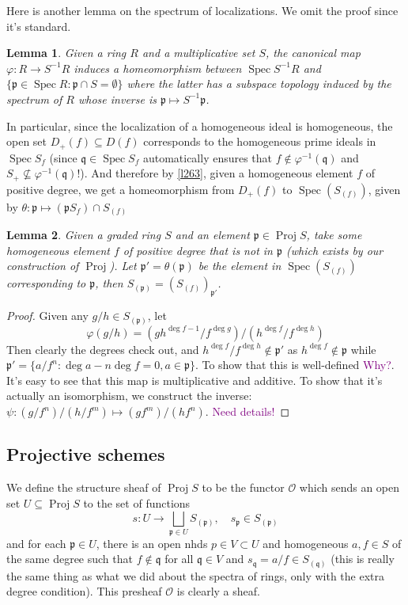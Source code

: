 \documentclass[12pt]{article}
\newtheorem{lemma}{Lemma}[subsection]
\theoremstyle{remark}
\newcommand{\Spec}[0]{\operatorname{Spec}}
\newcommand{\Proj}[0]{\operatorname{Proj}}
\begin{document}
	Here is another lemma on the spectrum of localizations. We omit the proof since it's standard.
	\begin{lemma}\label{l264}
		Given a ring $R$ and a multiplicative set $S$, the canonical map $\varphi:R\to S^{-1}R$ induces a homeomorphism between $\Spec S^{-1}R$ and $\{\mathfrak p\in \Spec R:\mathfrak p\cap S=\emptyset\}$ where the latter has a subspace topology induced by the spectrum of $R$ whose inverse is $\mathfrak p\mapsto S^{-1}\mathfrak p$.
	\end{lemma}
	In particular, since the localization of a homogeneous ideal is homogeneous, the open set $D_+(f)\subseteq D(f)$ corresponds to the homogeneous prime ideals in $\Spec S_f$ (since $\mathfrak q\in\Spec S_f$ automatically ensures that $f\notin\varphi^{-1}(\mathfrak q)$ and $S_+\not\subseteq \varphi^{-1}(\mathfrak q)$!). And therefore by \autoref{l263}, given a homogeneous element $f$ of positive degree, we get a homeomorphism from $D_+(f)$ to $\Spec(S_{(f)})$, given by $\theta:\mathfrak p\mapsto (\mathfrak pS_f)\cap S_{(f)}$

	\begin{lemma}\label{l265}
		Given a graded ring $S$ and an element $\mathfrak p\in\Proj S$, take some homogeneous element $f$ of positive degree that is not in $\mathfrak p$ (which exists by our construction of $\Proj$). Let $\mathfrak p'=\theta(\mathfrak p)$ be the element in $\Spec(S_{(f)})$ corresponding to $\mathfrak p$, then $S_{(\mathfrak p)}=(S_{(f)})_{\mathfrak p'}$.
	\end{lemma}
	\begin{proof}
		Given any $g/h\in S_{(\mathfrak p)}$, let
		\[\varphi(g/h)=(gh^{\deg f-1}/f^{\deg g})/(h^{\deg f}/f^{\deg h})\]
		Then clearly the degrees check out, and $h^{\deg f}/f^{\deg h}\notin\mathfrak p'$ as $h^{\deg f}\notin\mathfrak p$ while $\mathfrak p'=\{a/f^n:\deg a-n\deg f=0, a\in\mathfrak p\}$. To show that this is well-defined \textcolor{purple}{Why?}. It's easy to see that this map is multiplicative and additive. To show that it's actually an isomorphism, we construct the inverse: $\psi:(g/f^{n})/(h/f^{m})\mapsto (gf^{m})/(hf^n)$. \textcolor{purple}{Need details!}
	\end{proof}

	\subsection{Projective schemes}\label{ssec-proj-scheme}
	We define the structure sheaf of $\Proj S$ to be the functor $\mathscr O$ which sends an open set $U\subseteq\Proj S$ to the set of functions
	\[s:U\to \bigsqcup_{\mathfrak p\in U}S_{(\mathfrak p)},\quad s_{\mathfrak p}\in S_{(\mathfrak p)}\]
	and for each $\mathfrak p\in U$, there is an open nhds $p\in V\subset U$ and homogeneous $a, f\in S$ of the same degree such that $f\notin \mathfrak q$ for all $\mathfrak q\in V$ and $s_{\mathfrak q}=a/f\in S_{(\mathfrak q)}$ (this is really the same thing as what we did about the spectra of rings, only with the extra degree condition). This presheaf $\mathscr O$ is clearly a sheaf.
	
\end{document}
